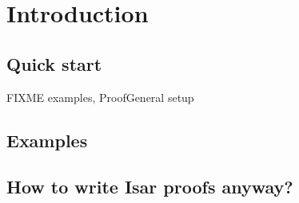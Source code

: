 
\chapter{Introduction}

\section{Quick start}

FIXME examples, ProofGeneral setup

\section{Examples}

\section{How to write Isar proofs anyway?}


